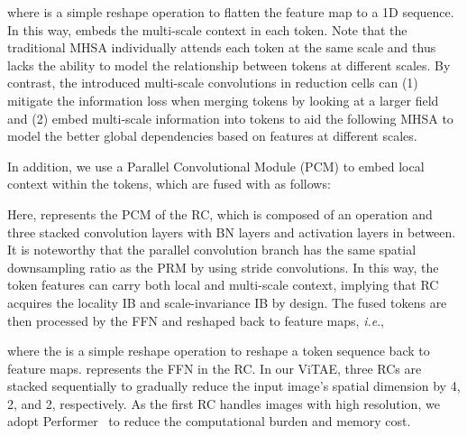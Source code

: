 \documentclass[twocolumn]{svjour3}          \smartqed  \usepackage{natbib}
\newcommand{\ie}{i.e}
\def\onedot{.\xspace}
\def\ie{\emph{i.e}\onedot}
\begin{document}
where  is a simple reshape operation to flatten the feature map to a 1D sequence. In this way,  embeds the multi-scale context in each token. Note that the traditional MHSA individually attends each token at the same scale and thus lacks the ability to model the relationship between tokens at different scales. By contrast, the introduced multi-scale convolutions in reduction cells can (1) mitigate the information loss when merging tokens by looking at a larger field and (2) embed multi-scale information into tokens to aid the following MHSA to model the better global dependencies based on features at different scales. 

In addition, we use a Parallel Convolutional Module (PCM) to embed local context within the tokens, which are fused with  as follows:

Here,  represents the PCM of the  RC, which is composed of an  operation and three stacked convolution layers with BN layers and activation layers in between. It is noteworthy that the parallel convolution branch has the same spatial downsampling ratio as the PRM by using stride convolutions. In this way, the token features can carry both local and multi-scale context, implying that RC acquires the locality IB and scale-invariance IB by design. The fused tokens are then processed by the FFN and reshaped back to feature maps, \ie,

where the  is a simple reshape operation to reshape a token sequence back to feature maps.  represents the FFN in the  RC. In our ViTAE, three RCs are stacked sequentially to gradually reduce the input image's spatial dimension by 4, 2, and 2, respectively. As the first RC handles images with high resolution, we adopt Performer~\citep{choromanski2020rethinking} to reduce the computational burden and memory cost.
\end{document}
